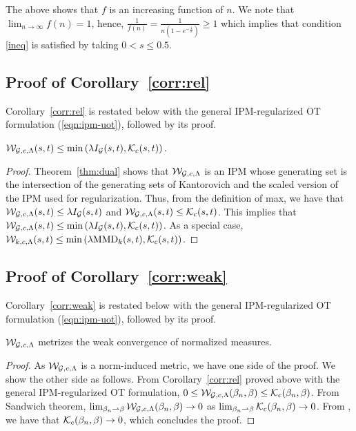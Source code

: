 The above shows that $f$ is an increasing function of $n$. We note that $\lim_{n\to \infty} f(n)=1$, hence, $\frac{1}{f(n)}=\frac{1}{n\left(1-e^{-\frac{1}{n}}\right)}\geq 1$ which implies that condition \ref{ineq} is satisfied by taking $0<s\leq 0.5$.

\subsection[Relation between MMD-OT, Kantorovich Metric and the involved IPM]{Proof of Corollary~\ref{corr:rel}}\label{proof:corr}
Corollary~\ref{corr:rel} is restated below with the general IPM-regularized OT formulation (\ref{eqn:ipm-uot}), followed by its proof.
\begin{corollaryBox}
\begin{corollary}
    $\mathcal{W}_{\mathcal{G}, c, \Lambda}(s, t)\leq \min\left(\lambda I_{\mathcal{G}}(s, t), \mathcal{K}_c(s, t)\right).$
\end{corollary}
\end{corollaryBox}
\begin{proof}
    Theorem~\ref{thm:dual} shows that $\mathcal{W}_{\mathcal{G}, c, \Lambda}$ is an IPM whose generating set is the intersection of the generating sets of Kantorovich and the scaled version of the IPM used for regularization. Thus, from the definition of max, we have that $\mathcal{W}_{\mathcal{G}, c, \Lambda}(s, t)\leq \lambda  I_{\mathcal{G}}(s, t)$ and $\mathcal{W}_{\mathcal{G}, c, \Lambda}(s, t)\leq \mathcal{K}_c(s, t)$. This implies that $\mathcal{W}_{\mathcal{G}, c, \Lambda}(s, t)\leq \min\left(\lambda I_{\mathcal{G}}(s, t), \mathcal{K}_c(s, t)\right)$. As a special case, $\mathcal{W}_{k, c, \Lambda}(s, t)\leq \min\left(\lambda\textup{MMD}_k(s, t), \mathcal{K}_c(s, t)\right)$.
\end{proof}

\subsection[Proof of our Weak-Metrization Result]{Proof of Corollary~\ref{corr:weak}}\label{proof:corr-weak}
Corollary~\ref{corr:weak} is restated below with the general IPM-regularized OT formulation (\ref{eqn:ipm-uot}), followed by its proof.
\begin{corollaryBox}
\begin{corollary}
    $\mathcal{W}_{\mathcal{G}, c, \Lambda}$ metrizes the weak convergence of normalized measures.
\end{corollary}
\end{corollaryBox}
\begin{proof}
As $\mathcal{W}_{\mathcal{G}, c, \Lambda}$ is a norm-induced metric, we have one side of the proof. We show the other side as follows. 
    From Corollary~\ref{corr:rel} proved above with the general IPM-regularized OT formulation,
    $0\leq \mathcal{W}_{\mathcal{G}, c, \Lambda}(\beta_n, \beta) \leq \mathcal{K}_c(\beta_n, \beta)$.
    \newline
    From Sandwich theorem, $\lim_{\beta_n\rightharpoonup \beta}\mathcal{W}_{\mathcal{G}, c, \Lambda}(\beta_n, \beta)\rightarrow 0$ as $\lim_{\beta_n\rightharpoonup \beta}\mathcal{K}_c(\beta_n, \beta) \rightarrow 0$.  From \citet[Theorem (6.9)]{villanioldnew}, we have that $\mathcal{K}_c(\beta_n, \beta) \rightarrow 0$, which concludes the proof.
\end{proof}

